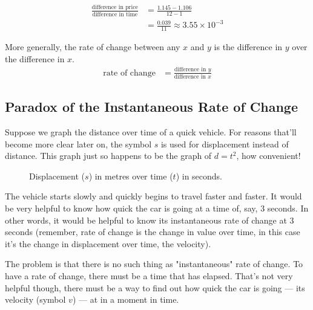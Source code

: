 \begin{align*}
	\frac{\text{difference in price}}{\text{difference in time}} &=\frac{1.145-1.106}{12-1}\\[0.75em]
	&=\frac{0.039}{11} \approx 3.55\times10^{-3}
\end{align*}

More generally, the rate of change between any $x$ and $y$ is the difference in $y$ over the difference in $x$.
\begin{align*}
\text{rate of change} &= \frac{\text{difference in $y$}}{\text{difference in $x$}}
\end{align*}

\subsection{Paradox of the Instantaneous Rate of Change}
Suppose we graph the distance over time of a quick vehicle. For reasons that'll become more clear later on, the symbol $s$ is used for displacement instead of distance. This graph just so happens to be the graph of $d=t^2$, how convenient!

\begin{figure}[h!]
	\centering
	\caption{Displacement ($s$) in metres over time ($t$) in seconds.}
	\label{POIexample}
\end{figure}

The vehicle starts slowly and quickly begins to travel faster and faster. It would be very helpful to know how quick the car is going at a time of, say, 3 seconds. In other words, it would be helpful to know its instantaneous rate of change at 3 seconds (remember, rate of change is the change in value over time, in this case it's the change in displacement over time, the velocity).

The problem is that there is no such thing as "instantaneous" rate of change. To have a rate of change, there must be a time that has elapsed. That's not very helpful though, there must be a way to find out how quick the car is going --- its velocity (symbol $v$) --- at in a moment in time.

